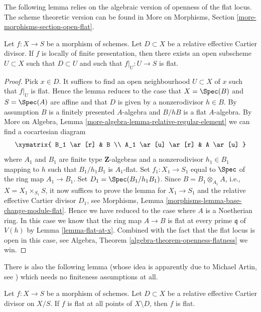 \noindent
The following lemma relies on the algebraic version of
openness of the flat locus. The scheme theoretic version can be found in
More on Morphisms, Section \ref{more-morphisms-section-open-flat}.

\begin{lemma}
\label{lemma-flat-relative-Cartier-divisor}
Let $f : X \to S$ be a morphism of schemes.
Let $D \subset X$ be a relative effective Cartier divisor.
If $f$ is locally of finite presentation, then there exists
an open subscheme $U \subset X$ such that $D \subset U$ and
such that $f|_U : U \to S$ is flat.
\end{lemma}

\begin{proof}
Pick $x \in D$. It suffices to find an open neighbourhood $U \subset X$
of $x$ such that $f|_U$ is flat. Hence the lemma reduces to the case
that $X = \Spec(B)$ and $S = \Spec(A)$ are affine
and that $D$ is given by a nonzerodivisor $h \in B$. By assumption
$B$ is a finitely presented $A$-algebra and $B/hB$ is a flat
$A$-algebra. By More on Algebra, Lemma
\ref{more-algebra-lemma-relative-regular-element} we can find
a cocartesian diagram
$$
\xymatrix{
B_1 \ar[r] & B \\
A_1 \ar[u] \ar[r] & A \ar[u]
}
$$
where $A_1$ and $B_1$ are finite type $\mathbf{Z}$-algebras
and a nonzerodivisor $h_1 \in B_1$ mapping to $h$ such that
$B_1/h_1B_1$ is $A_1$-flat.
Set $f_1 : X_1 \to S_1$ equal to $\Spec$ of the
ring map $A_1 \to B_1$. Set $D_1 = \Spec(B_1/h_1B_1)$.
Since $B = B_1 \otimes_{A_1} A$, i.e., $X = X_1 \times_{S_1} S$,
it now suffices to prove the lemma for $X_1 \to S_1$ and the relative
effective Cartier divisor $D_1$, see
Morphisms, Lemma \ref{morphisms-lemma-base-change-module-flat}.
Hence we have reduced to the case where $A$ is a Noetherian ring.
In this case we know that the ring map $A \to B$ is flat at every
prime $\mathfrak q$ of $V(h)$ by
Lemma \ref{lemma-flat-at-x}.
Combined with the fact that the flat locus is open in this case, see
Algebra, Theorem \ref{algebra-theorem-openness-flatness}
we win.
\end{proof}

\noindent
There is also the following lemma (whose idea is apparently
due to Michael Artin, see \cite{Nobile}) which needs no finiteness
assumptions at all.

\begin{lemma}
\label{lemma-michael-artin}
Let $f : X \to S$ be a morphism of schemes.
Let $D \subset X$ be a relative effective Cartier divisor on $X/S$.
If $f$ is flat at all points of $X \setminus D$, then $f$ is flat.
\end{lemma}

